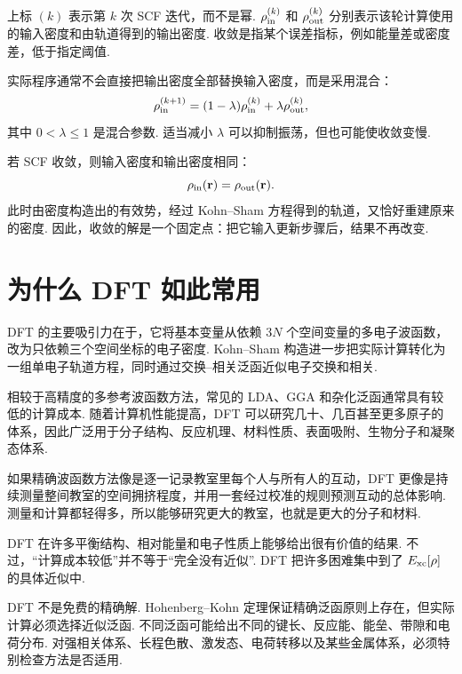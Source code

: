 \documentclass[UTF8,11pt,a4paper,openany]{ctexbook}
\begin{document}
\begin{notationbox}
上标 $(k)$ 表示第 $k$ 次 SCF 迭代，而不是幂. $\rho_{\rm in}^{(k)}$ 和 $\rho_{\rm out}^{(k)}$ 分别表示该轮计算使用的输入密度和由轨道得到的输出密度. 收敛是指某个误差指标，例如能量差或密度差，低于指定阈值. 
\end{notationbox}

实际程序通常不会直接把输出密度全部替换输入密度，而是采用混合：
\[
\rho_{\rm in}^{(k+1)}
=
(1-\lambda)\rho_{\rm in}^{(k)}
+
\lambda\rho_{\rm out}^{(k)},
\]
其中 $0<\lambda\leq 1$ 是混合参数. 适当减小 $\lambda$ 可以抑制振荡，但也可能使收敛变慢. 

\begin{derivationbox}
若 SCF 收敛，则输入密度和输出密度相同：
\[
\rho_{\rm in}(\mathbf r)=\rho_{\rm out}(\mathbf r).
\]
此时由密度构造出的有效势，经过 Kohn--Sham 方程得到的轨道，又恰好重建原来的密度. 因此，收敛的解是一个固定点：把它输入更新步骤后，结果不再改变. 
\end{derivationbox}

\section{为什么 DFT 如此常用}

DFT 的主要吸引力在于，它将基本变量从依赖 $3N$ 个空间变量的多电子波函数，改为只依赖三个空间坐标的电子密度. Kohn--Sham 构造进一步把实际计算转化为一组单电子轨道方程，同时通过交换--相关泛函近似电子交换和相关. 

相较于高精度的多参考波函数方法，常见的 LDA、GGA 和杂化泛函通常具有较低的计算成本. 随着计算机性能提高，DFT 可以研究几十、几百甚至更多原子的体系，因此广泛用于分子结构、反应机理、材料性质、表面吸附、生物分子和凝聚态体系. 

\begin{analogybox}
如果精确波函数方法像是逐一记录教室里每个人与所有人的互动，DFT 更像是持续测量整间教室的空间拥挤程度，并用一套经过校准的规则预测互动的总体影响. 测量和计算都轻得多，所以能够研究更大的教室，也就是更大的分子和材料. 
\end{analogybox}

DFT 在许多平衡结构、相对能量和电子性质上能够给出很有价值的结果. 不过，“计算成本较低”并不等于“完全没有近似”. DFT 把许多困难集中到了 $E_{\rm xc}[\rho]$ 的具体近似中. 

\begin{limitbox}
DFT 不是免费的精确解. Hohenberg--Kohn 定理保证精确泛函原则上存在，但实际计算必须选择近似泛函. 不同泛函可能给出不同的键长、反应能、能垒、带隙和电荷分布. 对强相关体系、长程色散、激发态、电荷转移以及某些金属体系，必须特别检查方法是否适用. 
\end{limitbox}
\end{document}
